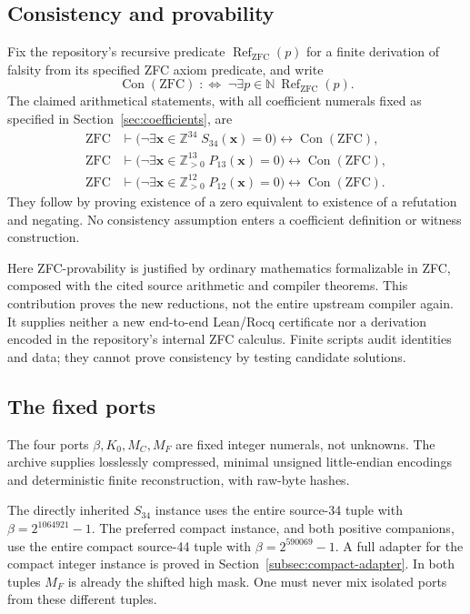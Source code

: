 \documentclass[11pt,a4paper]{article}
\theoremstyle{definition}
\newcommand{\Z}{\mathbb Z}
\newcommand{\N}{\mathbb N}
\newcommand{\Zp}{\mathbb Z_{>0}}
\newcommand{\Con}{\operatorname{Con}(\mathrm{ZFC})}
\newcommand{\ZFCRef}{\operatorname{Ref}_{\mathrm{ZFC}}}
\newcommand{\MC}{M_C}
\newcommand{\MF}{M_F}
\begin{document}
\subsection{Consistency and provability}

Fix the repository's recursive predicate \(\ZFCRef(p)\) for a finite
derivation of falsity from its specified ZFC axiom predicate, and
write
\[
 \Con\;:\!\!\iff\;\neg\exists p\in\N\ \ZFCRef(p).
\]
The claimed arithmetical statements, with all coefficient numerals
fixed as specified in Section~\ref{sec:coefficients}, are
\begin{align}
 \mathrm{ZFC}&\vdash
 \bigl(\neg\exists\mathbf x\in\Z^{34}\;S_{34}(\mathbf x)=0\bigr)
       \longleftrightarrow\Con,                 \label{eq:claim34}\\
 \mathrm{ZFC}&\vdash
 \bigl(\neg\exists\mathbf x\in\Zp^{13}\;P_{13}(\mathbf x)=0\bigr)
       \longleftrightarrow\Con,                 \label{eq:claim13}\\
 \mathrm{ZFC}&\vdash
 \bigl(\neg\exists\mathbf x\in\Zp^{12}\;P_{12}(\mathbf x)=0\bigr)
       \longleftrightarrow\Con.                 \label{eq:claim12}
\end{align}
They follow by proving existence of a zero equivalent to existence
of a refutation and negating. No consistency assumption enters a
coefficient definition or witness construction.

Here ZFC-provability is justified by ordinary mathematics
formalizable in ZFC, composed with the cited source arithmetic
and compiler theorems. This contribution proves the new
reductions, not the entire upstream compiler again. It supplies
neither a new end-to-end Lean/Rocq certificate nor a derivation
encoded in the repository's internal ZFC calculus. Finite scripts
audit identities and data; they cannot prove consistency by
testing candidate solutions.

\subsection{The fixed ports}

The four ports \(\beta,K_0,\MC,\MF\) are fixed integer numerals,
not unknowns. The archive supplies losslessly compressed,
minimal unsigned little-endian encodings and deterministic
finite reconstruction, with raw-byte hashes.

The directly inherited \(S_{34}\) instance uses the entire
source-34 tuple with \(\beta=2^{1064921}-1\).
The preferred compact instance, and both positive companions,
use the entire compact source-44 tuple with
\(\beta=2^{590069}-1\). A full adapter for the compact integer
instance is proved in Section~\ref{subsec:compact-adapter}.
In both tuples \(\MF\) is already the shifted high mask.
One must never mix isolated ports from these different tuples.
\end{document}
